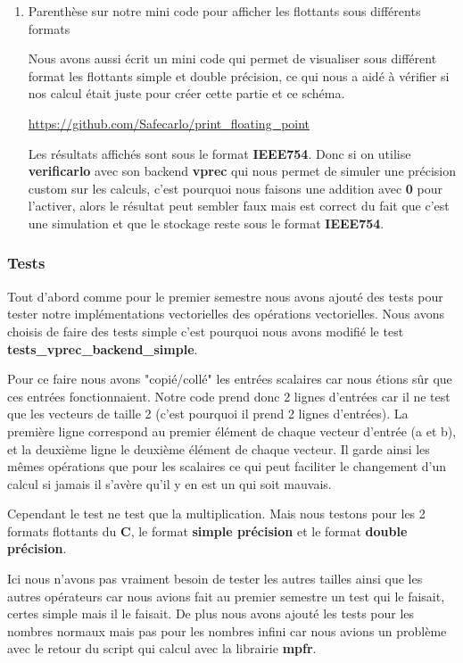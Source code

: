 \documentclass[12pt, letterpaper]{article}
\begin{document}
\begin{enumerate}
\item Parenthèse sur notre mini code pour afficher les flottants sous différents formats
\label{sec:orgc571db5}

Nous avons aussi écrit un mini code qui permet de visualiser sous différent
format les flottants simple et double précision, ce qui nous a aidé à
vérifier si nos calcul était juste pour créer cette partie et ce schéma.

\url{https://github.com/Safecarlo/print\_floating\_point}

Les résultats affichés sont sous le format \textbf{IEEE754}. Donc si on utilise
\textbf{verificarlo} avec son backend \textbf{vprec} qui nous permet de simuler une
précision custom sur les calculs, c'est pourquoi nous faisons une addition
avec \textbf{0} pour l'activer, alors le résultat peut sembler faux mais est
correct du fait que c'est une simulation et que le stockage reste sous le
format \textbf{IEEE754}.
\end{enumerate}

\subsubsection{Tests}
\label{sec:org6cb4124}

Tout d'abord comme pour le premier semestre nous avons ajouté des tests pour
tester notre implémentations vectorielles des opérations vectorielles. Nous
avons choisis de faire des tests simple c'est pourquoi nous avons modifié
le test \textbf{tests\_vprec\_backend\_simple}.

Pour ce faire nous avons "copié/collé" les entrées scalaires car nous étions
sûr que ces entrées fonctionnaient. Notre code prend donc 2 lignes d'entrées car il
ne test que les vecteurs de taille 2 (c'est pourquoi il prend 2 lignes
d'entrées). La première ligne correspond au premier élément de chaque vecteur
d'entrée (a et b), et la deuxième ligne le deuxième élément de chaque
vecteur. Il garde ainsi les mêmes opérations que pour les scalaires ce qui
peut faciliter le changement d'un calcul si jamais il s'avère qu'il y en est
un qui soit mauvais.

Cependant le test ne test que la multiplication. Mais nous testons pour les
2 formats flottants du \textbf{C}, le format \textbf{simple précision} et le format
\textbf{double précision}.

Ici nous n'avons pas vraiment besoin de tester les autres tailles ainsi que
les autres opérateurs car nous avions fait au premier semestre un test qui
le faisait, certes simple mais il le faisait. De plus nous avons ajouté les
tests pour les nombres normaux mais pas pour les nombres infini car nous
avions un problème avec le retour du script qui calcul avec la librairie
\textbf{mpfr}.
\end{document}
